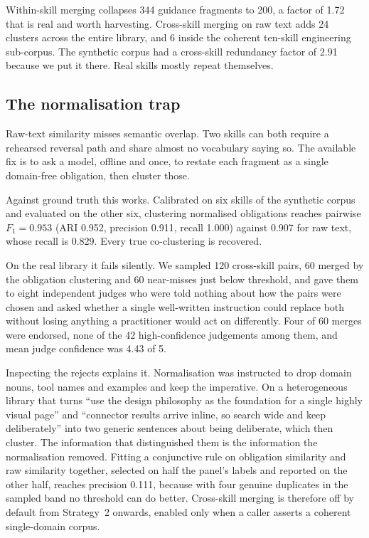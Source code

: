\documentclass[11pt]{article}
\begin{document}
Within-skill merging collapses 344 guidance fragments to 200, a factor of 1.72 that is real and
worth harvesting. Cross-skill merging on raw text adds 24 clusters across the entire library, and 6
inside the coherent ten-skill engineering sub-corpus. The synthetic corpus had a cross-skill
redundancy factor of 2.91 because we put it there. Real skills mostly repeat themselves.

\subsection{The normalisation trap}
\label{sec:s2trap}

Raw-text similarity misses semantic overlap. Two skills can both require a rehearsed reversal path
and share almost no vocabulary saying so. The available fix is to ask a model, offline and once, to
restate each fragment as a single domain-free obligation, then cluster those.

Against ground truth this works. Calibrated on six skills of the synthetic corpus and evaluated on
the other six, clustering normalised obligations reaches pairwise $F_1 = 0.953$ (ARI 0.952,
precision 0.911, recall 1.000) against 0.907 for raw text, whose recall is 0.829. Every true
co-clustering is recovered.

On the real library it fails silently. We sampled 120 cross-skill pairs, 60 merged by the
obligation clustering and 60 near-misses just below threshold, and gave them to eight independent
judges who were told nothing about how the pairs were chosen and asked whether a single well-written
instruction could replace both without losing anything a practitioner would act on differently.
Four of 60 merges were endorsed, none of the 42 high-confidence judgements among them, and mean
judge confidence was 4.43 of 5.

Inspecting the rejects explains it. Normalisation was instructed to drop domain nouns, tool names
and examples and keep the imperative. On a heterogeneous library that turns ``use the design
philosophy as the foundation for a single highly visual page'' and ``connector results arrive inline,
so search wide and keep deliberately'' into two generic sentences about being deliberate, which then
cluster. The information that distinguished them is the information the normalisation removed.
Fitting a conjunctive rule on obligation similarity and raw similarity together, selected on half
the panel's labels and reported on the other half, reaches precision 0.111, because with four
genuine duplicates in the sampled band no threshold can do better. Cross-skill merging is therefore
off by default from Strategy~2 onwards, enabled only when a caller asserts a coherent single-domain
corpus.
\end{document}

